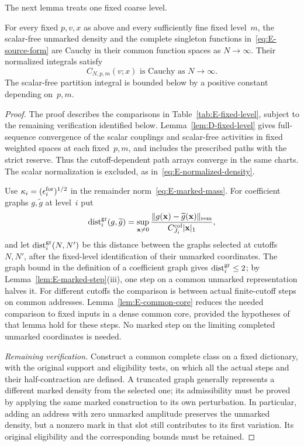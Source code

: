 The next lemma treats one fixed coarse level.
\begin{lemma}\label{lem:E-fixed-level}
For every fixed $p,v,x$ as above and every sufficiently fine fixed level~$m$, the scalar-free unmarked density and the complete singleton functions in~\eqref{eq:E-source-form} are Cauchy in their common function spaces as $N\to\infty$. Their normalized integrals satisfy
\begin{equation}\label{eq:E-coarse-cauchy}
 C_{N,p,m}(v;x)\text{ is Cauchy as }N\to\infty.
\end{equation}
The scalar-free partition integral is bounded below by a positive constant depending on~$p,m$.
\end{lemma}
\begin{proof}
The proof describes the comparisons in Table~\ref{tab:E-fixed-level}, subject to the remaining verification identified below. Lemma~\ref{lem:D-fixed-level} gives full-sequence convergence of the scalar couplings and scalar-free activities in fixed weighted spaces at each fixed~$p,m$, and includes the prescribed paths with the strict reserve. Thus the cutoff-dependent path arrays converge in the same charts. The scalar normalization is excluded, as in~\eqref{eq:E-normalized-density}.

Use $\kappa_i=(\epsilon_i^{\rm for})^{1/2}$ in the remainder norm~\eqref{eq:E-marked-mass}. For coefficient graphs $g,\widetilde g$ at level~$i$ put
\begin{equation*}
 \operatorname{dist}^{\rm gr}_i(g,\widetilde g)=\sup_{\mathbf x\ne0}\frac{\|g(\mathbf x)-\widetilde g(\mathbf x)\|_{\rm rem}}{C^{\rm col}_{J_i}|\mathbf x|_1},
\end{equation*}
and let $\operatorname{dist}^{\rm gr}_i(N,N')$ be this distance between the graphs selected at cutoffs $N,N'$, after the fixed-level identification of their unmarked coordinates. The graph bound in the definition of a coefficient graph gives $\operatorname{dist}^{\rm gr}_i\le2$; by Lemma~\ref{lem:E-marked-step}(iii), one step on a common unmarked representation halves it. For different cutoffs the comparison is between actual finite-cutoff steps on common addresses. Lemma~\ref{lem:E-common-core} reduces the needed comparison to fixed inputs in a dense common core, provided the hypotheses of that lemma hold for these steps. No marked step on the limiting completed unmarked coordinates is needed.

\emph{Remaining verification.} Construct a common complete class on a fixed dictionary, with the original support and eligibility tests, on which all the actual steps and their half-contraction are defined. A truncated graph generally represents a different marked density from the selected one; its admissibility must be proved by applying the same marked construction to its own perturbation. In particular, adding an address with zero unmarked amplitude preserves the unmarked density, but a nonzero mark in that slot still contributes to its first variation. Its original eligibility and the corresponding bounds must be retained.


\end{proof}
